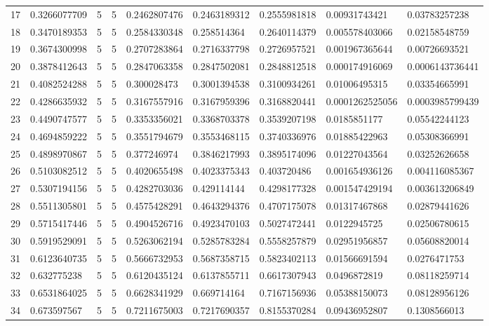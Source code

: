 \begin{tabular}{@{}lllllllll@{}}
17 & 0.3266077709 & 5 & 5 & 0.2462807476 & 0.2463189312 & 0.2555981818 & 0.00931743421 & 0.03783257238 \\
18 & 0.3470189353 & 5 & 5 & 0.2584330348 & 0.258514364 & 0.2640114379 & 0.005578403066 & 0.02158548759 \\
19 & 0.3674300998 & 5 & 5 & 0.2707283864 & 0.2716337798 & 0.2726957521 & 0.001967365644 & 0.00726693521 \\
20 & 0.3878412643 & 5 & 5 & 0.2847063358 & 0.2847502081 & 0.2848812518 & 0.000174916069 & 0.0006143736441 \\
21 & 0.4082524288 & 5 & 5 & 0.300028473 & 0.3001394538 & 0.3100934261 & 0.01006495315 & 0.03354665991 \\
22 & 0.4286635932 & 5 & 5 & 0.3167557916 & 0.3167959396 & 0.3168820441 & 0.0001262525056 & 0.0003985799439 \\
23 & 0.4490747577 & 5 & 5 & 0.3353356021 & 0.3368703378 & 0.3539207198 & 0.0185851177 & 0.05542244123 \\
24 & 0.4694859222 & 5 & 5 & 0.3551794679 & 0.3553468115 & 0.3740336976 & 0.01885422963 & 0.05308366991 \\
25 & 0.4898970867 & 5 & 5 & 0.377246974 & 0.3846217993 & 0.3895174096 & 0.01227043564 & 0.03252626658 \\
26 & 0.5103082512 & 5 & 5 & 0.4020655498 & 0.4023375343 & 0.403720486 & 0.001654936126 & 0.004116085367 \\
27 & 0.5307194156 & 5 & 5 & 0.4282703036 & 0.429114144 & 0.4298177328 & 0.001547429194 & 0.003613206849 \\
28 & 0.5511305801 & 5 & 5 & 0.4575428291 & 0.4643294376 & 0.4707175078 & 0.01317467868 & 0.02879441626 \\
29 & 0.5715417446 & 5 & 5 & 0.4904526716 & 0.4923470103 & 0.5027472441 & 0.0122945725 & 0.02506780615 \\
30 & 0.5919529091 & 5 & 5 & 0.5263062194 & 0.5285783284 & 0.5558257879 & 0.02951956857 & 0.05608820014 \\
31 & 0.6123640735 & 5 & 5 & 0.5666732953 & 0.5687358715 & 0.5823402113 & 0.01566691594 & 0.0276471753 \\
32 & 0.632775238 & 5 & 5 & 0.6120435124 & 0.6137855711 & 0.6617307943 & 0.0496872819 & 0.08118259714 \\
33 & 0.6531864025 & 5 & 5 & 0.6628341929 & 0.669714164 & 0.7167156936 & 0.05388150073 & 0.08128956126 \\
34 & 0.673597567 & 5 & 5 & 0.7211675003 & 0.7217690357 & 0.8155370284 & 0.09436952807 & 0.1308566013 \\

\end{tabular}

